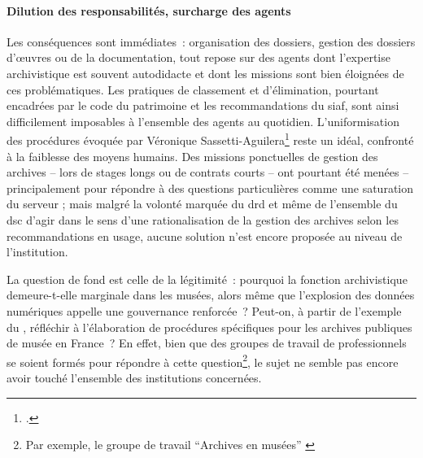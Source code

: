 \paragraph*{Dilution des responsabilités, surcharge des agents}
Les conséquences sont immédiates~: organisation des dossiers, gestion des dossiers d’œuvres ou de la documentation, tout repose sur des agents dont l’expertise archivistique est souvent autodidacte et dont les missions sont bien éloignées de ces problématiques. Les pratiques de classement et d’élimination, pourtant encadrées par le code du patrimoine et les recommandations du \ac{siaf}, sont ainsi difficilement imposables à l'ensemble des agents au quotidien. L’uniformisation des procédures évoquée par Véronique Sassetti-Aguilera\footcite{sassetti-aguileraArchivesMuseesDiversites2020a} reste un idéal, confronté à la faiblesse des moyens humains. Des missions ponctuelles de gestion des archives -- lors de stages longs ou de contrats courts -- ont pourtant été menées -- principalement pour répondre à des questions particulières comme une saturation du serveur ; mais malgré la volonté marquée du \ac{drd} et même de l'ensemble du \ac{dsc} d'agir dans le sens d'une rationalisation de la gestion des archives selon les recommandations en usage, aucune solution n'est encore proposée au niveau de l'institution.

La question de fond est celle de la légitimité~: pourquoi la fonction archivistique demeure-t-elle marginale dans les musées, alors même que l’explosion des données numériques appelle une gouvernance renforcée ? Peut-on, à partir de l’exemple du \mae, réfléchir à l’élaboration de procédures spécifiques pour les archives publiques de musée en France ? En effet, bien que des groupes de travail de professionnels se soient formés pour répondre à cette question\footnote{Par exemple, le groupe de travail \enquote{Archives en musées} \cite{clergeauReseauArchivesMusees2015a}}, le sujet ne semble pas encore avoir touché l'ensemble des institutions concernées.